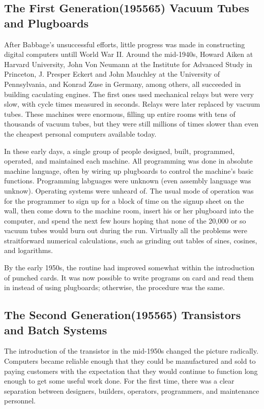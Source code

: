 \documentclass{book}
\begin{document}
\subsection{The First Generation(195565) Vacuum Tubes and Plugboards}
After Babbage's unsuccessful efforts, little progress was made in constructing digital computers untill World War II.
Around the mid-1940s, Howard Aiken at Harvard University, John Von Neumann at the Institute for Advanced Study in Princeton, 
J. Presper Eckert and John Mauchley at the University of Pennsylvania, and Konrad Zuse in Germany, 
among others, all succeeded in building caculating engines.
The first ones used mechanical relays but were very slow, with cycle times measured in seconds.
Relays were later replaced by vacuum tubes.
These machines were enormous, filling up entire rooms with tens of thousands of vacuum tubes, 
but they were still millions of times slower than even the cheapest personal computers available today.

In these early days, a single group of people designed, built, programmed, operated, and maintained each machine.
All programming was done in absolute machine language, often by wiring up plugboards to control the machine's basic functions.
Programming labguages were unknown (even assembly language was unknow).
Operating systems were unheard of.
The usual mode of operation was for the programmer to sign up for a block of time on the signup sheet on the wall, 
then come down to the machine room, insert his or her plugboard into the computer, 
and spend the next few hours hoping that none of the 20,000 or so vacuum tubes would burn out during the run.
Virtually all the problems were straitforward numerical calculations, such as grinding out tables of sines, cosines, and logarithms.

By the early 1950s, the routine had improved somewhat within the introduction of punched cards.
It was now possible to write programs on card and read them in instead of using plugboards; otherwise, the procedure was the same.

\subsection{The Second Generation(195565) Transistors and Batch Systems}
The introduction of the transistor in the mid-1950s changed the picture radically.
Computers became reliable enough that they could be manufactured and sold to paying customers with the expectation 
that they would continue to function long enough to get some useful work done.
For the first time, there was a clear separation between designers, builders, operators, programmers, and maintenance personnel.
\end{document}
